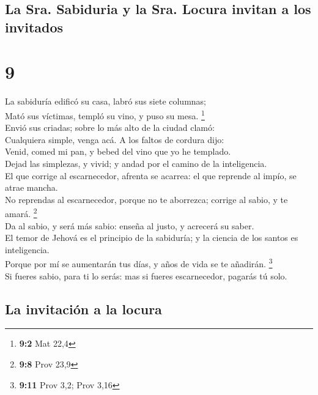 \hypertarget{la-sra.-sabiduria-y-la-sra.-locura-invitan-a-los-invitados}{%
\subsection{La Sra. Sabiduria y la Sra. Locura invitan a los
invitados}\label{la-sra.-sabiduria-y-la-sra.-locura-invitan-a-los-invitados}}

\hypertarget{section-8}{%
\section{9}\label{section-8}}

 La sabiduría edificó su casa, labró sus siete columnas;\\
 Mató sus víctimas, templó su vino, y puso su mesa.
\footnote{\textbf{9:2} Mat 22,4}\\
 Envió sus criadas; sobre lo más alto de la ciudad clamó:\\
 Cualquiera simple, venga acá. A los faltos de cordura
dijo:\\
 Venid, comed mi pan, y bebed del vino que yo he templado.\\
 Dejad las simplezas, y vivid; y andad por el camino de la
inteligencia.\\
 El que corrige al escarnecedor, afrenta se acarrea: el que
reprende al impío, se atrae mancha.\\
 No reprendas al escarnecedor, porque no te aborrezca;
corrige al sabio, y te amará. \footnote{\textbf{9:8} Prov 23,9}\\
 Da al sabio, y será más sabio: enseña al justo, y acrecerá
su saber.\\
 El temor de Jehová es el principio de la sabiduría; y la
ciencia de los santos es inteligencia.\\
 Porque por mí se aumentarán tus días, y años de vida se te
añadirán. \footnote{\textbf{9:11} Prov 3,2; Prov 3,16}\\
 Si fueres sabio, para ti lo serás: mas si fueres
escarnecedor, pagarás tú solo.

\hypertarget{la-invitaciuxf3n-a-la-locura}{%
\subsection{La invitación a la
locura}\label{la-invitaciuxf3n-a-la-locura}}


